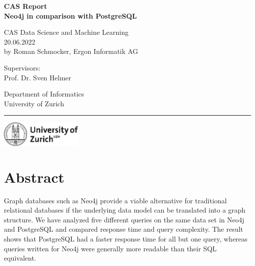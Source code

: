 \documentclass[11pt, a4paper,oneside,chapterprefix=false]{scrbook}
\begin{document}
\frontmatter
\begin{titlepage}
	\setlength{\parindent}{0cm}
	\addtolength{\textheight}{1.0cm}
	\vspace{0.5cm}
	\sffamily\Huge
	{\textbf {CAS Report \\ Neo4j in comparison with PostgreSQL}}

	\vfill \vfill \vfill

	\vfill
	\textsf\Large
	CAS Data Science and Machine Learning \\[0.5cm]\large
	20.06.2022\\[0.5cm]
	\large
	by Roman Schmocker, Ergon Informatik AG

	\vfill \vfill \vfill
	\begin{minipage}[b]{0.5\textwidth}
	Supervisors: \\
	Prof. Dr. Sven Helmer
	\end{minipage}
	\begin{minipage}[b]{0.5\textwidth} \raggedleft
	Department of Informatics \\
	University of Zurich
	\end{minipage}

	\vfill
	\hrule
	\vspace{0.5cm}
	\includegraphics*[width=0.3\textwidth]{figures/uzh_logo} \hfill
\end{titlepage}


\chapter{Abstract} \label{chp:abstract}

Graph databases such as Neo4j provide a viable alternative for traditional relational databases if the underlying data model can be translated into a graph structure. 
We have analyzed five different queries on the same data set in Neo4j and PostgreSQL and compared response time and query complexity. 
The result shows that PostgreSQL had a faster response time for all but one query, whereas queries written for Neo4j were generally more readable than their SQL equivalent.
\end{document}
